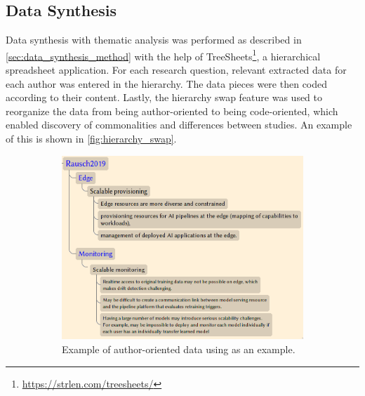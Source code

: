 \subsection{Data Synthesis}
Data synthesis with thematic analysis was performed as described in \cref{sec:data_synthesis_method} with the help of TreeSheets\footnote{\url{https://strlen.com/treesheets/}}, a hierarchical spreadsheet application.
For each research question, relevant extracted data for each author was entered in the hierarchy.
The data pieces were then coded according to their content.
Lastly, the hierarchy swap feature was used to reorganize the data from being author-oriented to being code-oriented, which enabled discovery of commonalities and differences between studies.
An example of this is shown in \cref{fig:hierarchy_swap}.
\begin{figure}
\centering
\begin{subfigure}[b]{0.45\textwidth}
    \centering
    \includegraphics[width=\textwidth]{figures/author-oriented.png}
    \caption{Example of author-oriented data using \cite{Rausch2019} as an example.}
    \label{fig:author-oriented}
\end{subfigure}
\hfill
\begin{subfigure}[b]{0.45\textwidth}
    \centering

\end{subfigure}
\end{figure}
